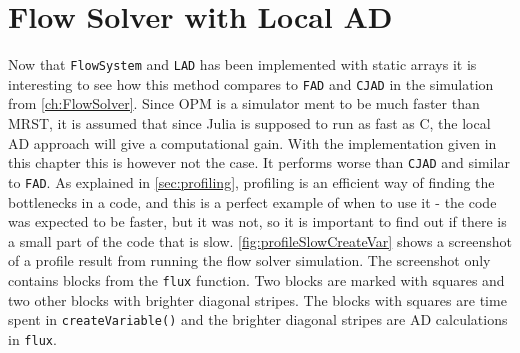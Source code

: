 \section{Flow Solver with Local AD}
\label{sec:flowSolverWithLAD}
Now that \texttt{FlowSystem} and \texttt{LAD} has been implemented with static arrays it is interesting to see how this method compares to \texttt{FAD} and \texttt{CJAD} in the simulation from \autoref{ch:FlowSolver}. Since OPM is a simulator ment to be much faster than MRST, it is assumed that since Julia is supposed to run as fast as C, the local AD approach will give a computational gain. With the implementation given in this chapter this is however not the case. It performs worse than \texttt{CJAD} and similar to \texttt{FAD}. As explained in \autoref{sec:profiling}, profiling is an efficient way of finding the bottlenecks in a code, and this is a perfect example of when to use it - the code was expected to be faster, but it was not, so it is important to find out if there is a small part of the code that is slow. \autoref{fig:profileSlowCreateVar} shows a screenshot of a profile result from running the flow solver simulation. The screenshot only contains blocks from the \texttt{flux} function. Two blocks are marked with squares and two other blocks with brighter diagonal stripes. The blocks with squares are time spent in \texttt{createVariable()} and the brighter diagonal stripes are AD calculations in \texttt{flux}.
